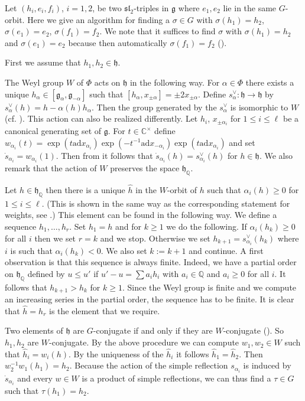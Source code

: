 \documentclass[a4paper,10pt]{amsart}
\newcommand{\C}{\mathbb{C}}
\newcommand{\Q}{\mathbb{Q}}
\newcommand{\mf}{\mathfrak}
\newcommand{\g}{\mf{g}}
\newcommand{\h}{\mf{h}}
\newcommand{\ssl}{\mf{sl}}
\newcommand{\ad}{\mathrm{ad}}
\numberwithin{equation}{section}
\theoremstyle{remark}
\theoremstyle{remark}
\begin{document}
Let $(h_i,e_i,f_i)$, $i=1,2$, be two $\ssl_2$-triples in $\g$ where $e_1,e_2$ lie
in the same $G$-orbit. Here we give an algorithm for finding a $\sigma\in G$
with $\sigma(h_1)=h_2$, $\sigma(e_1)=e_2$, $\sigma(f_1)=f_2$. We note that it
suffices to find $\sigma$ with $\sigma(h_1)=h_2$ and $\sigma(e_1)=e_2$ because
then automatically $\sigma(f_1)=f_2$ (\cite[Lemma 8.1.1]{gra16}).

First we assume that $h_1,h_2\in \h$.

The Weyl group $W$ of $\Phi$ acts on $\h$ in the following way.
For $\alpha\in \Phi$ there exists a unique $h_\alpha\in [\g_\alpha,\g_{-\alpha}]$
such that $[h_\alpha,x_{\pm\alpha}] = \pm 2x_{\pm\alpha}$.
Define $s_\alpha^\vee : \h\to\h$ by $s_\alpha^\vee(h) = h-\alpha(h) h_\alpha$.
Then the group generated by the $s_\alpha^\vee$ is isomorphic to $W$ (cf.
\cite[Remark 2.9.9]{gra16}). This action can also be realized differently.
Let $h_i$, $x_{\pm \alpha_i}$ for $1\leq i\leq\ell$ be a canonical generating set
of $\g$. For $t\in \C^\times$ define 
$w_{\alpha_i}(t) = \exp( t\ad x_{\alpha_i} ) \exp(-t^{-1}\ad x_{-\alpha_i})
\exp( t\ad x_{\alpha_i} )$ and set $\dot{s}_{\alpha_i}=w_{\alpha_i}(1)$. 
Then from \cite[Lemma 5.2.13]{gra16} it follows
that $\dot{s}_{\alpha_i}(h) = s_{\alpha_i}^\vee(h)$ for $h\in \h$. We also remark that
the action of $W$ preserves the space $\h_\Q$.

Let $h\in \h_\Q$ then there is a unique $\hat h$ in the $W$-orbit of $h$
such that $\alpha_i(h) \geq 0$ for $1\leq i\leq \ell$. (This is shown in the
same way as the corresponding statement for weights, see
\cite[Lemma 13.2A]{hum}.) This element can be found in the following way.
We define a sequence $h_1,\ldots,h_r$. Set $h_1=h$ and for $k\geq 1$ we do
the following. If $\alpha_i(h_k) \geq 0$ for all $i$ then we set $r=k$ and we
stop. Otherwise we set $h_{k+1} = s_{\alpha_i}^\vee(h_k)$ where $i$ is such that
$\alpha_i(h_k)<0$. We also set $k:= k+1$ and continue. A first observation is
that this sequence is always finite. Indeed,
we have a partial order on $\h_\Q$ defined by $u \leq u'$ if $u'-u =
\sum a_i h_i$ with $a_i\in \Q$ and $a_i\geq 0$ for all $i$. It follows
that $h_{k+1} >h_k$ for $k\geq 1$. Since the Weyl group is finite and we
compute an increasing series in the partial order, the sequence has to be
finite. It is clear that $\hat h=h_r$ is the element that we require.

Two elements of $\h$ are $G$-conjugate if and only if they are $W$-conjugate
(\cite[Corollary 5.8.5]{gra16}). So $h_1,h_2$ are $W$-conjugate. By the above
procedure we can compute $w_1,w_2\in W$ such that $\hat h_i = w_i(h)$.
By the uniqueness of the $\hat h_i$ it follows $\hat h_1 = \hat h_2$. 
Then $w_2^{-1}w_1(h_1)=h_2$. Because the action of the simple reflection
$s_{\alpha_i}$ is induced by $\dot{s}_{\alpha_i}$ and every $w\in W$ is a product of
simple reflections, we can thus find a $\tau\in G$ such that
$\tau(h_1)=h_2$. 
\end{document}
